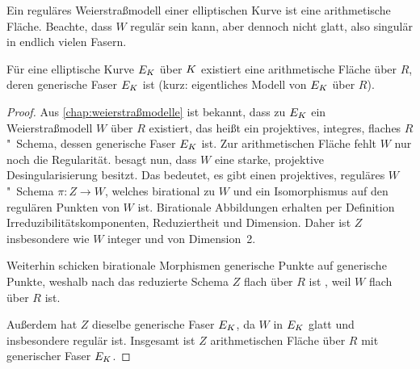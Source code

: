 \begin{Beispiel}\label{bsp:regweierstraßmodell}
  Ein reguläres Weierstraßmodell einer elliptischen Kurve ist eine
  arithmetische Fläche.
  Beachte, dass $W$ regulär sein kann, aber dennoch nicht glatt, also
  singulär in endlich vielen Fasern.
\end{Beispiel}

\begin{Satz}\label{thm:exarithfl}
  Für eine elliptische Kurve $E_{K}$ über $K$ existiert eine
  arithmetische Fläche über $R$, deren generische Faser $E_{K}$ ist
  (kurz: eigentliches Modell von $E_{K}$ über $R$).
  \begin{proof}
    Aus \autoref{chap:weierstraßmodelle} ist bekannt, dass zu $E_{K}$
    ein Weierstraßmodell $W$ über $R$ existiert, das heißt
    ein projektives, integres, flaches $R$"~Schema, dessen generische
    Faser $E_{K}$ ist. Zur arithmetischen Fläche fehlt $W$ nur noch die
    Regularität.
    \cite[Corollary~8.3.51]{liu} besagt nun, dass $W$ eine starke,
    projektive Desingularisierung besitzt. Das bedeutet, es gibt
    einen projektives, reguläres $W$"~Schema ${\pi\colon Z\to W}$,
    welches birational zu $W$ und ein Isomorphismus auf den regulären
    Punkten von $W$ ist.
    Birationale Abbildungen erhalten per Definition
    Irreduzibilitätskomponenten, Reduziertheit und Dimension.
    Daher ist $Z$ insbesondere wie $W$ integer
    und von Dimension~2.

    Weiterhin schicken birationale Morphismen generische Punkte auf
    generische Punkte, weshalb nach
    \cite[Proposition~III.9.7]{hartshorne} das reduzierte Schema $Z$
    flach über $R$ ist , weil $W$ flach über $R$ ist.

    Außerdem hat $Z$ dieselbe generische Faser $E_{K}$, da
    $W$ in $E_{K}$ glatt und insbesondere regulär ist.
    Insgesamt ist $Z$ arithmetischen Fläche über $R$ mit
    generischer Faser $E_{K}$.
  \end{proof}
\end{Satz}

